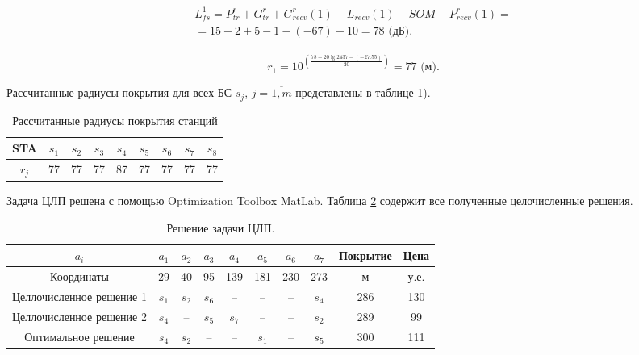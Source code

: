 \begin{align}
    \begin{aligned}
  L_{fs}^{1} = P_{tr}^r + G_{tr}^r + G_{recv}^r(1) - L_{recv}(1)  - SOM - P_{recv}^r(1) = \\
 = 15+2+5-1-(-67)-10 = 78 \text{ (дБ)}.
    \end{aligned}
\end{align}

\begin{displaymath}
  r_{1} = 10^{\left(\frac{78 - 20\lg{2437} - (-27.55)}{20}\right)} = 77 \text{ (м)}.
\end{displaymath}

Рассчитанные радиусы покрытия для всех БС $ s_j $, $ j = \overline{1, m} $ представлены в таблице \cref{tab:part3_rj}).

\begin{table}[h!]\begin{center}
  \begin{tabular}{|c||c|c|c|c|c|c|c|c|}\hline
      STA & $s_1$ & $s_2$ & $s_3$ & $s_4$ & $s_5$ & $s_6$ & $s_7$ & $s_8$\\ \hline \hline

      $r_{j}$ & 77 & 77 & 77 & 87 & 77 & 77 & 77 & 77\\ \hline

\end{tabular}\caption{Рассчитанные радиусы покрытия станций}\label{tab:part3_rj}
\end{center}\end{table}

Задача ЦЛП решена с помощью Optimization Toolbox MatLab. Таблица \cref{tab:part3_ilp_solution} содержит все полученные целочисленные решения.


\begin{table}[h!]\tiny\centering
  \begin{tabular}{|c||c|c|c|c|c|c|c||c|c|}\hline
    $a_i$ & $a_1$ &  $a_2$ & $a_3$ & $a_4$ & $a_5$ & $a_6$ & $a_7$  & Покрытие & Цена \\ \hline 
    Координаты & 29 & 40 & 95 & 139 & 181 & 230 & 273 & м & у.е.\\ \hline \hline
    Целлочисленное решение 1 & $s_1$ & $s_2$ & $s_6$ & -- & -- & -- & $s_4$ & 286 & 130\\ 
    Целлочисленное решение 2 & $s_4$ & -- & $s_5$ & $s_7$ & -- & -- & $s_2$ & 289 & 99\\
    Оптимальное решение & $s_4$ & $s_2$ & -- & -- & $s_1$ & -- & $s_5$ & 300 & 111 \\ \hline
\end{tabular}\caption{Решение задачи ЦЛП.}\label{tab:part3_ilp_solution}
\end{table}

